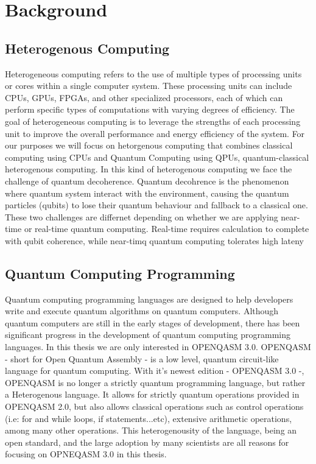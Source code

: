 \chapter{Background}
\label{chapter:Background}
\section{Heterogenous Computing}
Heterogeneous computing refers to the use of multiple types of processing units
or cores within a single computer system. These processing units can include
CPUs, GPUs, FPGAs, and other specialized processors, each of which can perform
specific types of computations with varying degrees of efficiency. The goal of
heterogeneous computing is to leverage the strengths of each processing unit to
improve the overall performance and energy efficiency of the system. For our
purposes we will focus on hetorgenous computing that combines classical
computing using CPUs and Quantum Computing using QPUs, quantum-classical
heterogenous computing.
In this kind of heterogenous computing we face the challenge of quantum
decoherence. Quantum decohrence is the phenomenon where quantum system interact
with the environment, causing the quantum particles (qubits) to lose their
quantum behaviour and fallback to a classical one.
These two challenges are differnet depending on whether we are applying
near-time or real-time quantum computing. Real-time requires calculation to
complete with qubit coherence, while near-timq quantum computing tolerates high
lateny %
\section{Quantum Computing Programming}
Quantum computing programming languages are designed to help developers write
and execute quantum algorithms on quantum computers. Although quantum computers
are still in the early stages of development, there has been significant
progress in the development of quantum computing programming languages. In this
thesis we are only interested in OPENQASM 3.0. OPENQASM - short for Open Quantum
Assembly - is a low level, quantum circuit-like language for quantum computing.
With it's newest edition - OPENQASM 3.0 -, OPENQASM is no longer a strictly
quantum programming language, but rather a Heterogenous language. It allows for
strictly quantum operations provided in OPENQASM 2.0, but also allows classical
operations such as control operations (i.e: for and while loops, if
statements...etc), extensive arithmetic operations, among many other operations.
This heterogenousity of the language, being an open standard, and the large
adoption by many scientists are all reasons for focusing on OPNEQASM 3.0 in this
thesis.
